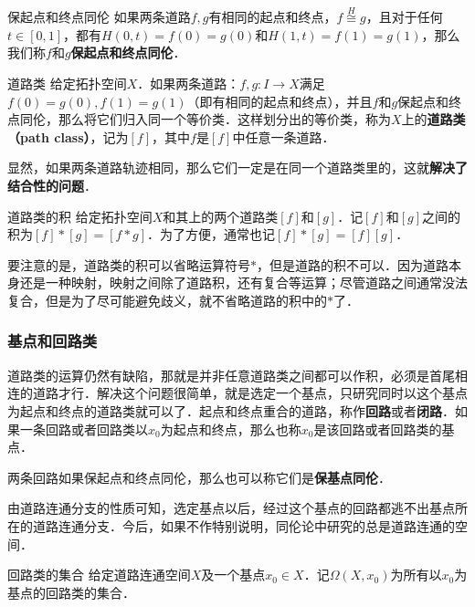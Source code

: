 \begin{definition}{保起点和终点同伦}
如果两条道路$f, g$有相同的起点和终点，$f\overset{H}{\cong}g$，且对于任何$t\in [0, 1]$，都有$H(0, t)=f(0)=g(0)$和$H(1, t)=f(1)=g(1)$，那么我们称$f$和$g$\textbf{保起点和终点同伦}．
\end{definition}

\begin{definition}{道路类}
给定拓扑空间$X$．如果两条道路：$f, g:I\rightarrow X$满足$f(0)=g(0), f(1)=g(1)$（即有相同的起点和终点），并且$f$和$g$保起点和终点同伦，那么将它们归入同一个等价类．这样划分出的等价类，称为$X$上的\textbf{道路类（path class）}，记为$[f]$，其中$f$是$[f]$中任意一条道路．
\end{definition}

显然，如果两条道路轨迹相同，那么它们一定是在同一个道路类里的，这就\textbf{解决了结合性的问题}．

\begin{definition}{道路类的积}
给定拓扑空间$X$和其上的两个道路类$[f]$和$[g]$．记$[f]$和$[g]$之间的积为$[f]*[g]=[f*g]$．为了方便，通常也记$[f]*[g]=[f][g]$．
\end{definition}

要注意的是，道路类的积可以省略运算符号$*$，但是道路的积不可以．因为道路本身还是一种映射，映射之间除了道路积，还有复合等运算；尽管道路之间通常没法复合，但是为了尽可能避免歧义，就不省略道路的积中的$*$了．

\subsubsection{基点和回路类}

道路类的运算仍然有缺陷，那就是并非任意道路类之间都可以作积，必须是首尾相连的道路才行．解决这个问题很简单，就是选定一个基点，只研究同时以这个基点为起点和终点的道路类就可以了．起点和终点重合的道路，称作\textbf{回路}或者\textbf{闭路}．如果一条回路或者回路类以$x_0$为起点和终点，那么也称$x_0$是该回路或者回路类的基点．

两条回路如果保起点和终点同伦，那么也可以称它们是\textbf{保基点同伦}．

由道路连通分支的性质可知，选定基点以后，经过这个基点的回路都逃不出基点所在的道路连通分支．今后，如果不作特别说明，同伦论中研究的总是道路连通的空间．

\begin{definition}{回路类的集合}
给定道路连通空间$X$及一个基点$x_0\in X$．记$\Omega(X, x_0)$为所有以$x_0$为基点的回路类的集合．
\end{definition}

